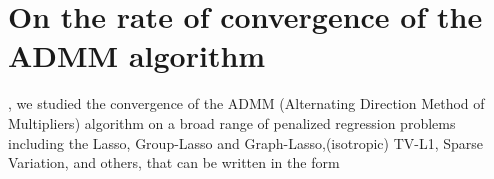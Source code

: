 


\section{On the rate of convergence of the ADMM algorithm}

 \citep{dohmatob2015local}, we studied the convergence of
the ADMM (Alternating Direction Method of
Multipliers) algorithm on a broad range of penalized regression
problems including the Lasso, Group-Lasso and Graph-Lasso,(isotropic)
TV-L1, Sparse Variation, and others, that can be written in the form

